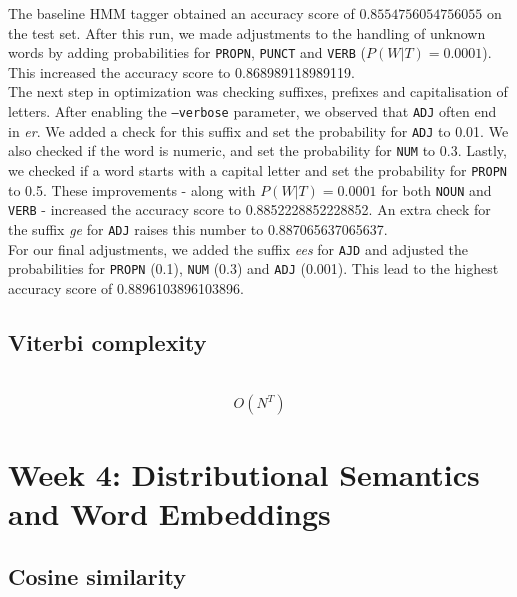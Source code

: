 \documentclass[a4paper, 11pt]{article}
\begin{document}
The baseline HMM tagger obtained an accuracy score of $0.8554756054756055$ on the test set. After this run, we made adjustments to the handling of unknown words by adding probabilities for \texttt{PROPN}, \texttt{PUNCT} and \texttt{VERB} ($P(W|T)=0.0001$). This increased the accuracy score to 0.868989118989119.\\


The next step in optimization was checking suffixes, prefixes and capitalisation of letters. After enabling the \texttt{--verbose} parameter, we observed that \texttt{ADJ} often end in \textit{er}. We added a check for this suffix and set the probability for \texttt{ADJ} to 0.01. We also checked if the word is numeric, and set the probability for \texttt{NUM} to 0.3. Lastly, we checked if a word starts with a capital letter and set the probability for \texttt{PROPN} to 0.5. These improvements - along with $P(W|T)=0.0001$ for both \texttt{NOUN} and \texttt{VERB} - increased the accuracy score to 0.8852228852228852. An extra check for the suffix \textit{ge} for \texttt{ADJ} raises this number to 0.887065637065637.\\

For our final adjustments, we added the suffix \textit{ees} for \texttt{AJD} and adjusted the probabilities for \texttt{PROPN} (0.1), \texttt{NUM} (0.3) and \texttt{ADJ} (0.001). This lead to the highest accuracy score of 0.8896103896103896.

\subsection{Viterbi complexity}

\noindent{}\\

$$O(N^T)$$

\section{Week 4: Distributional Semantics and Word Embeddings}

\subsection{Cosine similarity}

\noindent{}\\
\end{document}
